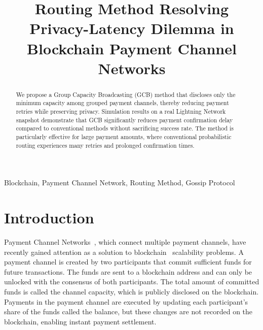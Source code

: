 \documentclass[a4paper]{IEEEtran}
\begin{document}
\title{Routing Method Resolving Privacy-Latency Dilemma in Blockchain Payment Channel Networks}

\author{
	\and
}

\maketitle

\begin{abstract}
	We propose a Group Capacity Broadcasting (GCB) method that discloses only the minimum capacity among grouped payment channels, thereby reducing payment retries while preserving privacy.
	Simulation results on a real Lightning Network snapshot demonstrate that GCB significantly reduces payment confirmation delay compared to conventional methods without sacrificing success rate.
	The method is particularly effective for large payment amounts, where conventional probabilistic routing experiences many retries and prolonged confirmation times.
\end{abstract}

\begin{IEEEkeywords}
	Blockchain, Payment Channel Network, Routing Method, Gossip Protocol
\end{IEEEkeywords}

\section{Introduction}

Payment Channel Networks~\cite{poon_dryja_2016}, which connect multiple payment channels, have recently gained attention as a solution to blockchain~\cite{nakamoto2008bitcoin} scalability problems.
A payment channel is created by two participants that commit sufficient funds for future transactions.
The funds are sent to a blockchain address and can only be unlocked with the consensus of both participants.
The total amount of committed funds is called the channel capacity, which is publicly disclosed on the blockchain.
Payments in the payment channel are executed by updating each participant's share of the funds called the balance, but these changes are not recorded on the blockchain, enabling instant payment settlement.
\end{document}
